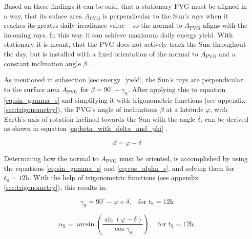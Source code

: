 Based on these findings it can be said, that a stationary PVG must be aligned in a way, that its suface area $A_{\mathrm{PVG}}$ is perpendicular to the Sun's rays when it reaches its greates daily irradiance value -- so the normal to $A_{\mathrm{PVG}}$ aligns with the incoming rays. In this way it can achieve maximum daily energy yield. With stationary it is meant, that the PVG does not actively track the Sun throughout the day, but is installed with a fixed orientation of the normal to $A_{\mathrm{PVG}}$ and a constant inclination angle $\beta$ \cite{Appelbaum:1993, Mertens:2015, Wagner:2018}.

As mentioned in subsection \ref{sec:energy_yield}, the Sun's rays are perpendicular to the surface area $A_{\mathrm{PVG}}$ for $\beta = 90^\circ - \gamma_{\mathrm{S}}$. After applying this to equation \ref{eq:sin_gamma_s} and simplifying it with trigonometric functions (see appendix \ref{sec:trigonometry}), the PVG's angle of inclinations $\beta$ at a latitude $\varphi$, with Earth's axis of rotation inclined towards the Sun with the angle $\delta$, can be derived as shown in equation \ref{eq:beta_with_delta_and_phi} \cite{Appelbaum:1993, Mertens:2015, Wagner:2018}.

\begin{center}
	\begin{equation} \label{eq:beta_with_delta_and_phi}
		\beta = \varphi - \delta
	\end{equation}
\end{center}

Determining how the normal to $A_{\mathrm{PVG}}$ must be oriented, is accomplished by using the equations \ref{eq:sin_gamma_s} and \ref{eq:cos_alpha_s}, and solving them for $t_{\mathrm{S}} = 12\mathrm{h}$. With the help of trigonometric functions (see appendix \ref{sec:trigonometry}), this results in:

\begin{center}
	\begin{equation} \label{eq:gamma_s_align}
		\gamma_{\mathrm{S}} = 90^\circ - \varphi + \delta \text{,} \quad \text{for } t_{\mathrm{S}} = 12\mathrm{h}
	\end{equation}
\end{center}

\begin{center}
	\begin{equation} \label{eq:alpha_s_align}
		\alpha_{\mathrm{S}} = \arcsin \left(\frac{\sin \left(\varphi - \delta\right)}{\cos \gamma_{\mathrm{S}}}\right) \text{,} \quad \text{for } t_{\mathrm{S}} = 12\mathrm{h} \text{.}
	\end{equation}
\end{center}

